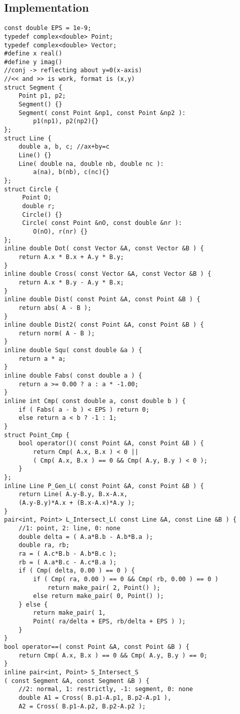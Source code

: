 \documentclass[10pt,twocolumn,oneside]{article}
\begin{document}
\subsection{Implementation}
\begin{verbatim}
const double EPS = 1e-9;
typedef complex<double> Point;
typedef complex<double> Vector;
#define x real()
#define y imag()
//conj -> reflecting about y=0(x-axis)
//<< and >> is work, format is (x,y)
struct Segment {
    Point p1, p2;
    Segment() {}
    Segment( const Point &np1, const Point &np2 ):
        p1(np1), p2(np2){}
};
struct Line {
    double a, b, c; //ax+by=c
    Line() {}
    Line( double na, double nb, double nc ):
        a(na), b(nb), c(nc){}
};
struct Circle {
     Point O;
     double r;
     Circle() {}
     Circle( const Point &nO, const double &nr ):
        O(nO), r(nr) {}
};
inline double Dot( const Vector &A, const Vector &B ) {
    return A.x * B.x + A.y * B.y;
}
inline double Cross( const Vector &A, const Vector &B ) {
    return A.x * B.y - A.y * B.x;
}
inline double Dist( const Point &A, const Point &B ) {
    return abs( A - B );
}
inline double Dist2( const Point &A, const Point &B ) {
    return norm( A - B );
}
inline double Squ( const double &a ) {
    return a * a;
}
inline double Fabs( const double a ) {
    return a >= 0.00 ? a : a * -1.00;
}
inline int Cmp( const double a, const double b ) {
    if ( Fabs( a - b ) < EPS ) return 0;
    else return a < b ? -1 : 1;
}
struct Point_Cmp {
    bool operator()( const Point &A, const Point &B ) {
        return Cmp( A.x, B.x ) < 0 ||
        ( Cmp( A.x, B.x ) == 0 && Cmp( A.y, B.y ) < 0 );
    }
};
inline Line P_Gen_L( const Point &A, const Point &B ) {
    return Line( A.y-B.y, B.x-A.x,
    (A.y-B.y)*A.x + (B.x-A.x)*A.y );
}
pair<int, Point> L_Intersect_L( const Line &A, const Line &B ) {
    //1: point, 2: line, 0: none
    double delta = ( A.a*B.b - A.b*B.a );
    double ra, rb;
    ra = ( A.c*B.b - A.b*B.c );
    rb = ( A.a*B.c - A.c*B.a );
    if ( Cmp( delta, 0.00 ) == 0 ) {
        if ( Cmp( ra, 0.00 ) == 0 && Cmp( rb, 0.00 ) == 0 )
            return make_pair( 2, Point() );
        else return make_pair( 0, Point() );
    } else {
        return make_pair( 1,
        Point( ra/delta + EPS, rb/delta + EPS ) );
    }
}
bool operator==( const Point &A, const Point &B ) {
    return Cmp( A.x, B.x ) == 0 && Cmp( A.y, B.y ) == 0;
}
inline pair<int, Point> S_Intersect_S
( const Segment &A, const Segment &B ) {
    //2: normal, 1: restrictly, -1: segment, 0: none
    double A1 = Cross( B.p1-A.p1, B.p2-A.p1 ),
    A2 = Cross( B.p1-A.p2, B.p2-A.p2 );

\end{verbatim}
\end{document}
